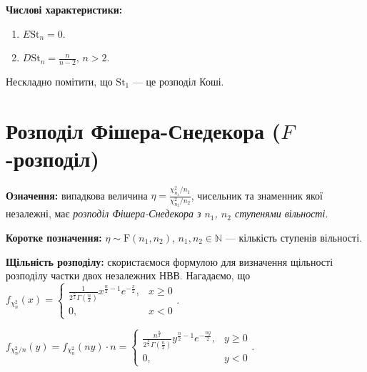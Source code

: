 
\noindent\textbf{Числові характеристики:}
\begin{enumerate}
    \item $E\mathrm{St}_n = 0$.
    \item $D\mathrm{St}_n = \frac{n}{n-2}$, $n>2$.
\end{enumerate}

\begin{remark}
    Нескладно помітити, що $\mathrm{St}_1$ --- це розподіл Коші.
\end{remark}

\section{Розподіл Фішера-Снедекора (\texorpdfstring{$F$}{F}-розподіл)}
\noindent\textbf{Означення:} випадкова величина $\eta = \frac{\chi_{n_1}^2/n_1}{\chi_{n_2}^2/n_2}$, чисельник
та знаменник якої незалежні, має \emph{розподіл Фішера-Снедекора з $n_1$, $n_2$ ступенями вільності}.

\noindent\textbf{Коротке позначення:} $\eta \sim \mathrm{F}(n_1, n_2)$, $n_1, n_2\in\mathbb{N}$ --- кількість ступенів вільності.

\noindent\textbf{Щільність розподілу:} скористаємося формулою для визначення щільності розподілу частки
двох незалежних НВВ. Нагадаємо, що 
$f_{\chi_n^2}(x) = \begin{cases}
    \frac{1}{2^{\frac{n}{2}} \Gamma\left(\frac{n}{2}\right)} x^{\frac{n}{2}-1} e^{-\frac{x}{2}}, & x \geq 0 \\
    0, & x < 0
\end{cases}$.

 $f_{\chi_n^2/n}(y) = f_{\chi_n^2}(n y) \cdot n = 
\begin{cases}
    \frac{n^{\frac{n}{2}}}{2^{\frac{n}{2}} \Gamma\left(\frac{n}{2}\right)} y^{\frac{n}{2}-1} e^{-\frac{ny}{2}}, & y \geq 0 \\
    0, & y < 0
\end{cases}$.

